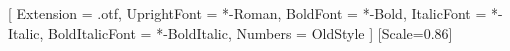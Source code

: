 %

\usepackage{fontspec}
\usepackage{unicode-math}

\setmainfont{P052}[
  Extension      = .otf,
  UprightFont    = *-Roman,
  BoldFont       = *-Bold,
  ItalicFont     = *-Italic,
  BoldItalicFont = *-BoldItalic,
  Numbers        = OldStyle
]
\setsansfont{TeX Gyre Heros}
\setmonofont{DejaVu Sans Mono}[Scale=0.86]

%
\usepackage{newunicodechar}
\newfontfamily{}

